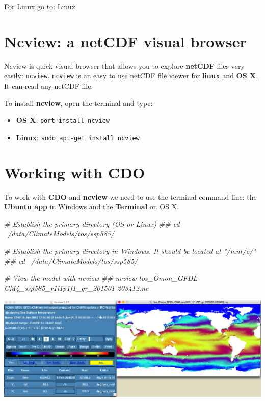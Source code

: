 \documentclass[]{book}
\newenvironment{Shaded}{\begin{snugshade}}{\end{snugshade}}
\newcommand{\CommentTok}[1]{\textcolor[rgb]{0.56,0.35,0.01}{\textit{#1}}}
\providecommand{\tightlist}{%
  \setlength{\itemsep}{0pt}\setlength{\parskip}{0pt}}
\begin{document}
For Linux go to: \href{https://code.mpimet.mpg.de/projects/cdo/wiki/Linux_Platform}{Linux}

\hypertarget{ncview-a-netcdf-visual-browser}{%
\section{Ncview: a netCDF visual browser}\label{ncview-a-netcdf-visual-browser}}

Ncview is quick visual browser that allows you to explore \textbf{netCDF} files very easily: \texttt{ncview}. \texttt{ncview} is an easy to use netCDF file viewer for \textbf{linux} and \textbf{OS X}. It can read any netCDF file.

To install \textbf{ncview}, open the terminal and type:

\begin{itemize}
\tightlist
\item
  \textbf{OS X}: \texttt{port\ install\ ncview}
\item
  \textbf{Linux}: \texttt{sudo\ apt-get\ install\ ncview}
\end{itemize}

\hypertarget{working-with-cdo}{%
\section{Working with CDO}\label{working-with-cdo}}

To work with \textbf{CDO} and \textbf{ncview} we need to use the terminal command line: the \textbf{Ubuntu app} in Windows and the \textbf{Terminal} on OS X.

\begin{Shaded}
\begin{Highlighting}[]
\CommentTok{# Establish the primary directory (OS or Linux)}
\CommentTok{## cd ~/data/ClimateModels/tos/ssp585/}

\CommentTok{# Establish the primary directory in Windows. It should be located at "/mnt/c/"}
\CommentTok{## cd ~/data/ClimateModels/tos/ssp585/}

\CommentTok{# View the model with ncview}
\CommentTok{## ncview tos_Omon_GFDL-CM4_ssp585_r1i1p1f1_gr_201501-203412.nc}
\end{Highlighting}
\end{Shaded}

\includegraphics[width=1\linewidth]{images/ncview01}
\end{document}

